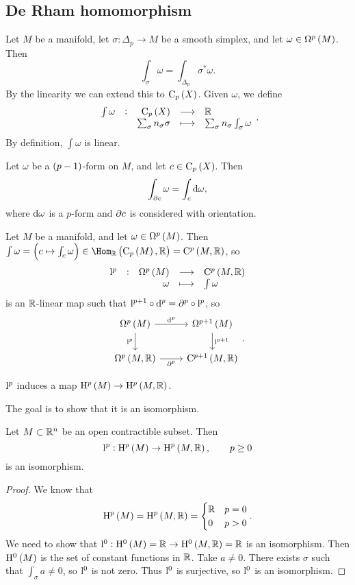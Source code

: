 \subsection{De Rham homomorphism}

Let $ M $ be a manifold, let $ \sigma : \Delta_p \to M $ be a smooth simplex, and let $ \omega \in \Omega^p\br{M} $. Then
$$ \int_\sigma \omega = \int_{\Delta_p} \sigma^*\omega. $$
By the linearity we can extend this to $ \C_p\br{X} $. Given $ \omega $, we define
$$ \function[\int \omega]{\C_p\br{X}}{\RR}{\sum_\sigma n_\sigma\sigma}{\sum_\sigma n_\sigma\int_\sigma \omega}. $$
By definition, $ \int \omega $ is linear.

\begin{theorem}
Let $ \omega $ be a $ \br{p - 1} $-form on $ M $, and let $ c \in \C_p\br{X} $. Then
$$ \int_{\partial c} \omega = \int_c \mathrm{d}\omega, $$
where $ \mathrm{d}\omega $ is a $ p $-form and $ \partial c $ is considered with orientation.
\end{theorem}

Let $ M $ be a manifold, and let $ \omega \in \Omega^p\br{M} $. Then $ \int \omega = \br{c \mapsto \int_c \omega} \in \Hom_\RR\br{\C_p\br{M}, \RR} = \C^p\br{M, \RR} $, so
$$ \function[\l^p]{\Omega^p\br{M}}{\C^p\br{M, \RR}}{\omega}{\int \omega} $$
is an $ \mathbb{R} $-linear map such that $ \mathrm{l}^{p + 1} \circ \mathrm{d}^p = \partial^p \circ \mathrm{l}^p $, so
$$
\begin{tikzcd}
\Omega^p\br{M} \arrow{r}{\d^p} \arrow{d}[swap]{\l^p} & \Omega^{p + 1}\br{M} \arrow{d}{\l^{p + 1}} \\
\Omega^p\br{M, \RR} \arrow{r}[swap]{\da^p} & \C^{p + 1}\br{M, \RR}
\end{tikzcd}.
$$

\begin{exercise*}
$ \mathrm{l}^p $ induces a map $ \H^p\br{M} \to \H^p\br{M, \RR} $.
\end{exercise*}

\pagebreak

The goal is to show that it is an isomorphism.

\begin{lemma}
\label{lem:4.10}
Let $ M \subset \mathbb{R}^n $ be an open contractible subset. Then
$$ \l^p : \H^p\br{M} \to \H^p\br{M, \RR}, \qquad p \ge 0 $$
is an isomorphism.
\end{lemma}

\begin{proof}
We know that
$$ \H^p\br{M} = \H^p\br{M, \RR} =
\begin{cases}
\RR & p = 0 \\
0 & p > 0
\end{cases}.
$$
We need to show that $ \l^0 : \H^0\br{M} = \RR \to \H^0\br{M, \RR} = \RR $ is an isomorphism. Then $ \H^0\br{M} $ is the set of constant functions in $ \mathbb{R} $. Take $ a \ne 0 $. There exists $ \sigma $ such that $ \int_\sigma a \ne 0 $, so $ \mathrm{l}^0 $ is not zero. Thus $ \mathrm{l}^0 $ is surjective, so $ \mathrm{l}^0 $ is an isomorphism.
\end{proof}

